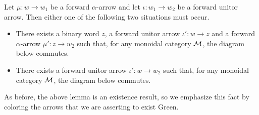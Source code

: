 \begin{lemma}\label{lemma:associator_unitor_swap}
    Let $\mu: w \to w_1$ be a forward $\alpha$-arrow
    and let $\iota: w_1 \to w_2$ be a forward unitor arrow.
    Then either one of the following two situations must occur.
    \begin{itemize}
        \item 
        There exists a binary word $z$, 
        a forward unitor arrow $\iota': w \to z$ 
        and a forward $\alpha$-arrow $\mu': z \to w_2$ such that, for any monoidal 
        category $\mathcal{M}$, the diagram below commutes.
        \begin{center}
        \end{center}
    \item There exists a forward unitor arrow $\iota': w \to w_2$ such that, for any monoidal 
    category $\mathcal{M}$, the diagram below commutes.
    \begin{center}
    \end{center}
\end{itemize}
\end{lemma}


As before, the above lemma is an existence result, 
so we emphasize this fact by coloring 
the arrows that we are asserting to exist Green. 

